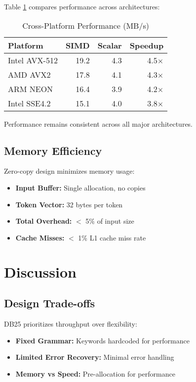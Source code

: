 \documentclass[conference]{IEEEtran}
\begin{document}
Table \ref{tab:platform} compares performance across architectures:

\begin{table}[htbp]
\centering
\caption{Cross-Platform Performance (MB/s)}
\label{tab:platform}
\begin{tabular}{|l|r|r|r|}
\hline
\textbf{Platform} & \textbf{SIMD} & \textbf{Scalar} & \textbf{Speedup} \\
\hline
Intel AVX-512 & 19.2 & 4.3 & 4.5$\times$ \\
AMD AVX2 & 17.8 & 4.1 & 4.3$\times$ \\
ARM NEON & 16.4 & 3.9 & 4.2$\times$ \\
Intel SSE4.2 & 15.1 & 4.0 & 3.8$\times$ \\
\hline
\end{tabular}
\end{table}

Performance remains consistent across all major architectures.

\subsection{Memory Efficiency}

Zero-copy design minimizes memory usage:

\begin{itemize}
\item \textbf{Input Buffer:} Single allocation, no copies
\item \textbf{Token Vector:} 32 bytes per token
\item \textbf{Total Overhead:} $<$ 5\% of input size
\item \textbf{Cache Misses:} $<$ 1\% L1 cache miss rate
\end{itemize}

\section{Discussion}

\subsection{Design Trade-offs}

DB25 prioritizes throughput over flexibility:

\begin{itemize}
\item \textbf{Fixed Grammar:} Keywords hardcoded for performance
\item \textbf{Limited Error Recovery:} Minimal error handling
\item \textbf{Memory vs Speed:} Pre-allocation for performance
\end{itemize}
\end{document}
